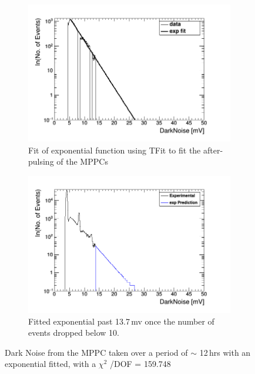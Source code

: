 \documentclass[12pt,a4paper]{article}
\begin{document}
\begin{figure}[H]
\centering
\begin{subfigure}{.5\textwidth}
  \centering
  \includegraphics[width=\linewidth]{fit_of_dark_noise.png}
  \captionsetup{width=.9\linewidth}
  \caption{Fit of exponential function using TFit to fit the after-pulsing of the MPPCs}
  \label{expFitOfDark}
\end{subfigure}%
\begin{subfigure}{.5\textwidth}
  \centering
  \includegraphics[width=\linewidth]{fittedDarkNoise_output.png}
  \captionsetup{width=.9\linewidth}
  \caption{Fitted exponential past 13.7\,mv once the number of events dropped below 10.}
  \label{fittedDarkNoise}
\end{subfigure}
\caption{Dark Noise from the MPPC taken over a period of $\sim$ 12\,hrs with an exponential fitted, with a $\chi ^2$ /DOF = 159.748}
\label{fitting_of_non_peak_dark_noise}
\end{figure}
\end{document}
